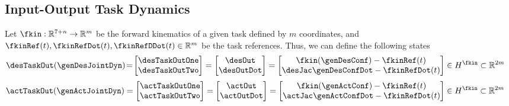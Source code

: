 \subsection{Input-Output Task Dynamics}\label{subsec-chap3:in-out task dynamics}
Let  $\fkin:\mathbb{R}^{7+n} \rightarrow\mathbb{R}^m$ be the forward kinematics of a given task defined by $m$ coordinates, and $\fkinRef(t),\fkinRefDot(t),\fkinRefDDot(t)\in\mathbb{R}^m$ be the task references. %
Thus, we can define the following states
\begin{align}
	\label{eq:des output vector}
	\desTaskOut(\genDesJointDyn) &\!=\! 	\begin{bmatrix}
		\desTaskOutOne \\ %
		\desTaskOutTwo %
	\end{bmatrix}=
	\begin{bmatrix}
		\desOut \\
		\desOutDot
	\end{bmatrix}=
	\begin{bmatrix}
		\fkin(\genDesConf) - \fkinRef(t) \\
		\desJac\genDesConfDot - \fkinRefDot(t) %
	\end{bmatrix}\in H^{\fkin}\subset\mathbb{R}^{2m} %
\end{align}
\begin{align}
	\label{eq:act output vector}
	\actTaskOut(\genActJointDyn) &= \begin{bmatrix}
		\actTaskOutOne \\ %
		\actTaskOutTwo%
	\end{bmatrix}=
	\begin{bmatrix}
		\actOut \\
		\actOutDot
	\end{bmatrix} =
	\begin{bmatrix}
		\fkin(\genActConf) - \fkinRef(t) \\
		\actJac\genActConfDot - \fkinRefDot(t)
	\end{bmatrix} \in H^{\fkin}\subset\mathbb{R}^{2m}
\end{align}

